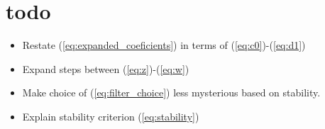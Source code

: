 \documentclass[a4paper]{article}
\begin{document}
\section{todo}
\begin{itemize}
\item Restate (\ref{eq:expanded_coeficients}) in terms of (\ref{eq:c0})-(\ref{eq:d1})
\item Expand steps between (\ref{eq:z})-(\ref{eq:w})
\item Make choice of (\ref{eq:filter_choice}) less mysterious based on stability.
\item Explain stability criterion (\ref{eq:stability})
\end{itemize}
\end{document}

